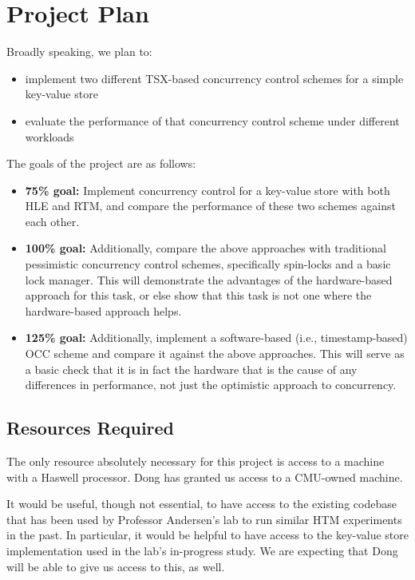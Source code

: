 \section{Project Plan} \label{sec:plan}

Broadly speaking, we plan to:
\begin{itemize}
\item implement two different TSX-based concurrency control schemes for a simple key-value store
\item evaluate the performance of that concurrency control scheme under different workloads
\end{itemize}
The goals of the project are as follows:
\begin{itemize}
\item \textbf{75\% goal:} Implement concurrency control for a key-value store with both HLE and RTM, and compare the performance of these two schemes against each other.
\item \textbf{100\% goal:} Additionally, compare the above approaches with traditional pessimistic concurrency control schemes, specifically spin-locks and a basic lock manager. This will demonstrate the advantages of the hardware-based approach for this task, or else show that this task is not one where the hardware-based approach helps.
\item \textbf{125\% goal:} Additionally, implement a software-based (i.e., timestamp-based) OCC scheme and compare it against the above approaches. This will serve as a basic check that it is in fact the hardware that is the cause of any differences in performance, not just the optimistic approach to concurrency.
\end{itemize}

\subsection{Resources Required}
The only resource absolutely necessary for this project is access to a machine with a Haswell processor. Dong has granted us access to a CMU-owned machine.

It would be useful, though not essential, to have access to the existing codebase that has been used by Professor Andersen's lab to run similar HTM experiments in the past. In particular, it would be helpful to have access to the key-value store implementation used in the lab's in-progress study. We are expecting that Dong will be able to give us access to this, as well.

